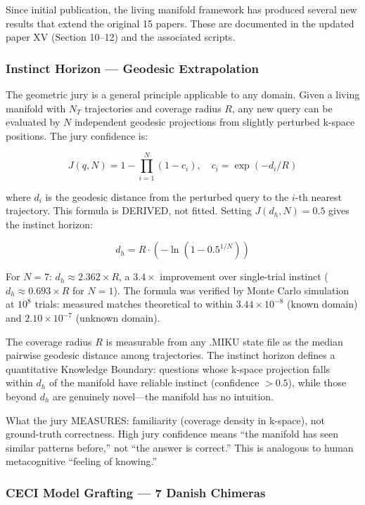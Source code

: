 \documentclass[11pt]{article}
\begin{document}
Since initial publication, the living manifold framework has produced several new results that extend the original 15 papers. These are documented in the updated paper XV (Section 10--12) and the associated scripts.

\subsubsection*{Instinct Horizon --- Geodesic Extrapolation}

The geometric jury is a general principle applicable to any domain. Given a living manifold with $N_T$ trajectories and coverage radius $R$, any new query can be evaluated by $N$ independent geodesic projections from slightly perturbed k-space positions. The jury confidence is:

$$J(q, N) = 1 - \prod_{i=1}^N (1 - c_i), \quad c_i = \exp(-d_i / R)$$

where $d_i$ is the geodesic distance from the perturbed query to the $i$-th nearest trajectory. This formula is DERIVED, not fitted. Setting $J(d_h, N) = 0.5$ gives the instinct horizon:

$$d_h = R \cdot (-\ln(1 - 0.5^{1/N}))$$

For $N = 7$: $d_h \approx 2.362 \times R$, a $3.4\times$ improvement over single-trial instinct ($d_h \approx 0.693 \times R$ for $N = 1$). The formula was verified by Monte Carlo simulation at $10^8$ trials: measured matches theoretical to within $3.44 \times 10^{-8}$ (known domain) and $2.10 \times 10^{-7}$ (unknown domain).

The coverage radius $R$ is measurable from any .MIKU state file as the median pairwise geodesic distance among trajectories. The instinct horizon defines a quantitative Knowledge Boundary: questions whose k-space projection falls within $d_h$ of the manifold have reliable instinct (confidence $> 0.5$), while those beyond $d_h$ are genuinely novel---the manifold has no intuition.

What the jury MEASURES: familiarity (coverage density in k-space), not ground-truth correctness. High jury confidence means ``the manifold has seen similar patterns before,'' not ``the answer is correct.'' This is analogous to human metacognitive ``feeling of knowing.''

\subsubsection*{CECI Model Grafting --- 7 Danish Chimeras}
\end{document}
